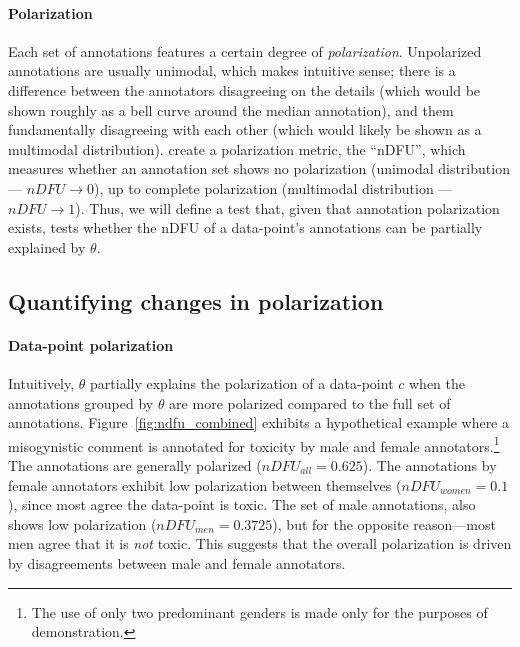 \documentclass{article}
\begin{document}
\paragraph{Polarization} Each set of annotations features a certain degree of \textit{polarization}. Unpolarized annotations are usually unimodal, which makes intuitive sense; there is a difference between the annotators disagreeing on the details (which would be shown roughly as a bell curve around the median annotation), and them fundamentally disagreeing with each other (which would likely be shown as a multimodal distribution). \textcite{pavlopoulos-likas-2024} create a polarization metric, the ``\ac{nDFU}'', which measures whether an annotation set shows no polarization (unimodal distribution --- $nDFU \rightarrow 0$), up to complete polarization (multimodal distribution --- $nDFU \rightarrow 1$). Thus, we will define a test that, given that annotation polarization exists, tests whether the \ac{nDFU} of a data-point's annotations can be partially explained by $\theta$.


\subsection{Quantifying changes in polarization}
\label{ssec:methodology:intuition}

\paragraph{Data-point polarization} Intuitively, $\theta$ partially explains the polarization of a data-point $c$ when the annotations grouped by $\theta$ are more polarized compared to the full set of annotations. Figure~\ref{fig:ndfu_combined} exhibits a hypothetical example where a misogynistic comment is annotated for toxicity by male and female annotators.\footnote{The use of only two predominant genders is made only for the purposes of demonstration.} The annotations are generally polarized ($nDFU_{all} = 0.625$). The annotations by female annotators exhibit low polarization between themselves ($nDFU_{women} = 0.1$), since most agree the data-point is toxic. The set of male annotations, also shows low polarization ($nDFU_{men} = 0.3725$), but for the opposite reason---most men agree that it is \emph{not} toxic. This suggests that the overall polarization is driven by disagreements between male and female annotators.
\end{document}
